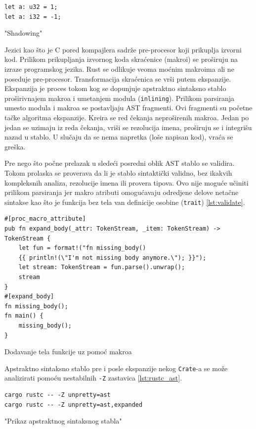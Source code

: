 \documentclass[11pt]{article}
\begin{document}
\begin{listing}[H]
\begin{verbatim}
let a: u32 = 1;
let a: i32 = -1;
\end{verbatim}
\caption{"Shadowing"}
\label{lst:shadowing}
\end{listing}

Jezici kao što je C pored kompajlera sadrže pre-procesor koji prikuplja izvorni kod. 
Prilikom prikupljanja izvornog koda skraćenice (makroi) se proširuju na izraze programskog jezika. 
Rust se odlikuje veoma moćnim makroima ali ne poseduje pre-procesor. Transformacija skraćenica se vrši 
putem ekspanzije.  Ekspanzija je proces tokom kog se dopunjuje apstraktno sintaksno stablo
proširivnajem makroa i umetanjem modula (\verb|inlining|). Prilikom parsiranja umesto 
modula i makroa se postavljaju AST fragmenti. Ovi fragmenti su početne tačke algoritma ekspanzije.
Kreira se red čekanja neproširenih makroa. Jedan po jedan se uzimaju iz reda čekanja, vriši se rezolucija imena,
proširuju se i integrišu nazad u stablo. U slučaju da se nema napretka (loše napisan kod), vraća se greška.

Pre nego što počne prelazak u sledeći posredni oblik AST stablo se validira. 
Tokom prolaska se proverava da li je stablo sintaktički validno, bez ikakvih kompleksnih analiza,
rezolucije imena ili provera tipova. Ovo nije moguće učiniti prilikom parsiranja jer makro atributi 
omogućavaju odredjene delove netačne sintakse kao što je funkcija bez tela van definicije osobine (\verb|trait|) \ref{lst:validate}.

\begin{listing}[H]
\begin{verbatim}
#[proc_macro_attribute]
pub fn expand_body(_attr: TokenStream, _item: TokenStream) -> TokenStream {
    let fun = format!("fn missing_body() 
    {{ println!(\"I'm not missing body anymore.\"); }}");
    let stream: TokenStream = fun.parse().unwrap();
    stream
}
#[expand_body]
fn missing_body();
fn main() {
    missing_body();
}
\end{verbatim}
\caption{Dodavanje tela funkcije uz pomoć makroa}
\label{lst:validate}
\end{listing}

Apstraktno sintaksno stablo pre i posle ekspanzije nekog \verb|Crate|-a se može analizirati pomoću 
nestabilnih \verb|-Z| zastavica \ref{lst:rustc_ast}.

\begin{listing}[H]
\begin{verbatim}
cargo rustc -- -Z unpretty=ast
cargo rustc -- -Z unpretty=ast,expanded
\end{verbatim}
\caption{"Prikaz apstraktnog sintaksnog stabla"}
\label{lst:rustc_ast}
\end{listing}
\end{document}
